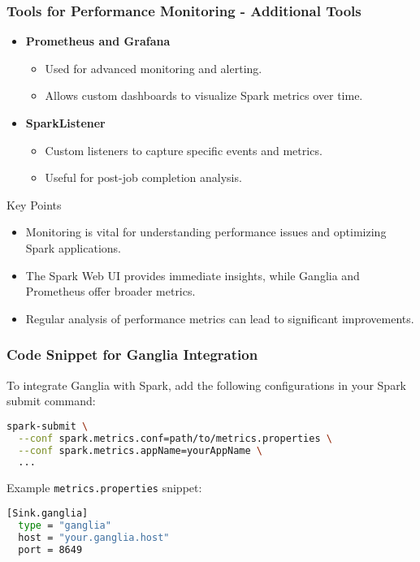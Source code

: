 \documentclass[aspectratio=169]{beamer}
\begin{document}
\begin{frame}[fragile]
    \frametitle{Tools for Performance Monitoring - Additional Tools}
    \begin{itemize}
        \item \textbf{Prometheus and Grafana}
            \begin{itemize}
                \item Used for advanced monitoring and alerting.
                \item Allows custom dashboards to visualize Spark metrics over time.
            \end{itemize}
        \item \textbf{SparkListener}
            \begin{itemize}
                \item Custom listeners to capture specific events and metrics.
                \item Useful for post-job completion analysis.
            \end{itemize}
    \end{itemize}
    
    \begin{block}{Key Points}
        \begin{itemize}
            \item Monitoring is vital for understanding performance issues and optimizing Spark applications.
            \item The Spark Web UI provides immediate insights, while Ganglia and Prometheus offer broader metrics.
            \item Regular analysis of performance metrics can lead to significant improvements.
        \end{itemize}
    \end{block}
\end{frame}

\begin{frame}[fragile]
    \frametitle{Code Snippet for Ganglia Integration}
    To integrate Ganglia with Spark, add the following configurations in your Spark submit command:
    \begin{lstlisting}[language=bash]
spark-submit \
  --conf spark.metrics.conf=path/to/metrics.properties \
  --conf spark.metrics.appName=yourAppName \
  ...
    \end{lstlisting}

    Example \texttt{metrics.properties} snippet:
    \begin{lstlisting}[language=bash]
[Sink.ganglia]
  type = "ganglia"
  host = "your.ganglia.host"
  port = 8649
    \end{lstlisting}
\end{frame}
\end{document}
